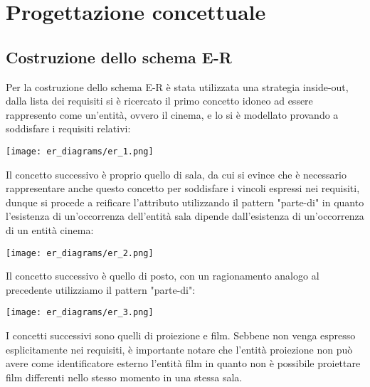 \section{Progettazione concettuale}

\subsection*{Costruzione dello schema E-R}
%
%
Per la costruzione dello schema E-R è stata utilizzata una strategia inside-out,
dalla lista dei requisiti si è ricercato il primo concetto idoneo ad essere
rappresento come un'entità, ovvero il cinema, e lo si è modellato provando a
soddisfare i requisiti relativi:

\begin{center}
    \texttt{[image: er\_diagrams/er\_1.png]}
\end{center}

Il concetto successivo è proprio quello di sala, da cui si evince che è
necessario rappresentare anche questo concetto per soddisfare i vincoli
espressi nei requisiti, dunque si procede a reificare l'attributo utilizzando
il pattern "parte-di" in quanto l'esistenza di un'occorrenza dell'entità
sala dipende dall'esistenza di un'occorrenza di un entità cinema:

\begin{center}
    \texttt{[image: er\_diagrams/er\_2.png]}
\end{center}

Il concetto successivo è quello di posto, con un ragionamento analogo al
precedente utilizziamo il pattern "parte-di":

\begin{center}
    \texttt{[image: er\_diagrams/er\_3.png]}
\end{center}

\pagebreak

I concetti successivi sono quelli di proiezione e film. Sebbene non venga
espresso esplicitamente nei requisiti, è importante notare che l'entità
proiezione non può avere come identificatore esterno l'entità film in quanto
non è possibile proiettare film differenti nello stesso momento in una stessa
sala.

